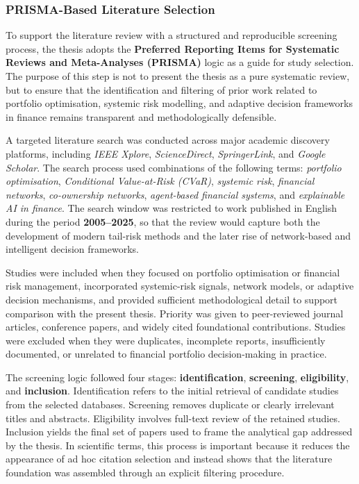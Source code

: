 \documentclass[11pt]{article}
\begin{document}
\subsubsection{PRISMA-Based Literature Selection}
To support the literature review with a structured and reproducible screening process, the thesis adopts the \textbf{Preferred Reporting Items for Systematic Reviews and Meta-Analyses (PRISMA)} logic as a guide for study selection. The purpose of this step is not to present the thesis as a pure systematic review, but to ensure that the identification and filtering of prior work related to portfolio optimisation, systemic risk modelling, and adaptive decision frameworks in finance remains transparent and methodologically defensible.

A targeted literature search was conducted across major academic discovery platforms, including \textit{IEEE Xplore}, \textit{ScienceDirect}, \textit{SpringerLink}, and \textit{Google Scholar}. The search process used combinations of the following terms: \textit{portfolio optimisation}, \textit{Conditional Value-at-Risk (CVaR)}, \textit{systemic risk}, \textit{financial networks}, \textit{co-ownership networks}, \textit{agent-based financial systems}, and \textit{explainable AI in finance}. The search window was restricted to work published in English during the period \textbf{2005--2025}, so that the review would capture both the development of modern tail-risk methods and the later rise of network-based and intelligent decision frameworks.

Studies were included when they focused on portfolio optimisation or financial risk management, incorporated systemic-risk signals, network models, or adaptive decision mechanisms, and provided sufficient methodological detail to support comparison with the present thesis. Priority was given to peer-reviewed journal articles, conference papers, and widely cited foundational contributions. Studies were excluded when they were duplicates, incomplete reports, insufficiently documented, or unrelated to financial portfolio decision-making in practice.

The screening logic followed four stages: \textbf{identification}, \textbf{screening}, \textbf{eligibility}, and \textbf{inclusion}. Identification refers to the initial retrieval of candidate studies from the selected databases. Screening removes duplicate or clearly irrelevant titles and abstracts. Eligibility involves full-text review of the retained studies. Inclusion yields the final set of papers used to frame the analytical gap addressed by the thesis. In scientific terms, this process is important because it reduces the appearance of ad hoc citation selection and instead shows that the literature foundation was assembled through an explicit filtering procedure.
\end{document}
